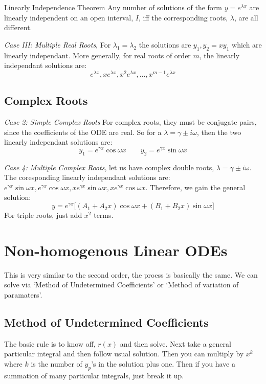 \documentclass{article}
\renewcommand{\l}{\lambda}
\newcommand{\g}{\gamma}
\renewcommand{\o}{\omega}
\begin{document}
\noindent\begin{theorem}{Linearly Independence Theorem}{}
   Any number of solutions of the form $y = e^{\l x}$ are linearly independent on an open interval, $I$, iff the corresponding roots, $\l$, are all different.
\end{theorem}\vspace{10pt}

\textit{Case III: Multiple Real Roots}, For $\l_1 = \l_2$ the solutions are $y_1, y_2 = xy_1$ which are linearly independant. More generally, for real roots of order $m$, the linearly independant solutions are:
$$ e^{\l x}, xe^{\l x}, x^2e^{\l x}, \dots, x^{m-1}e^{\l x} $$

\subsection{Complex Roots}

\textit{Case 2: Simple Complex Roots}
For complex roots, they must be conjugate pairs, since the coefficients of the ODE are real. So for a $\l = \g \pm i\o$, then the two linearly independant solutions are:
$$ y_1 = e^{\g x}\cos{\o x} \qquad y_2 = e^{\g x}\sin{\o x} $$

\textit{Case 4: Multiple Complex Roots}, let us have complex double roots, $\displaystyle{\l = \g \pm i\o}$. The coresponding linearly independant solutions are: $\displaystyle{e^{\g x}\sin{\o x}, e^{\g x}\cos{\o x}, xe^{\g x}\sin{\o x}, xe^{\g x}\cos{\o x}}$. Therefore, we gain the general solution:
$$ y = e^{\g x}\big[ (A_1 + A_2x)\cos{\o x} + (B_1 + B_2x)\sin{\o x}\big] $$
For triple roots, just add $x^2$ terms.

\section{Non-homogenous Linear ODEs}
This is very similar to the second order, the proess is basically the same. We can solve via `Method of Undetermined Coefficients' or `Method of variation of paramaters'.

\subsection{Method of Undetermined Coefficients}
The basic rule is to know off, $r(x)$ and then solve. Next take a general particular integral and then follow usual solution. Then you can multiply by $x^k$ where $k$ is the number of $y_p$'s in the solution plus one.
Then if you have a summation of many particular integrals, just break it up.
\end{document}
